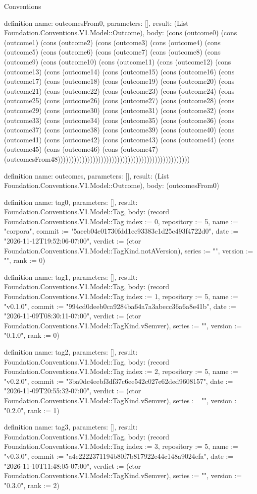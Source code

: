 \begin{lexlean}{Conventions}
\begin{semanticmodule}
definition{
  name: outcomesFrom0,
  parameters: [],
  result: (List Foundation.Conventions.V1.Model::Outcome),
  body: (cons (outcome0) (cons (outcome1) (cons (outcome2) (cons (outcome3) (cons (outcome4) (cons (outcome5) (cons (outcome6) (cons (outcome7) (cons (outcome8) (cons (outcome9) (cons (outcome10) (cons (outcome11) (cons (outcome12) (cons (outcome13) (cons (outcome14) (cons (outcome15) (cons (outcome16) (cons (outcome17) (cons (outcome18) (cons (outcome19) (cons (outcome20) (cons (outcome21) (cons (outcome22) (cons (outcome23) (cons (outcome24) (cons (outcome25) (cons (outcome26) (cons (outcome27) (cons (outcome28) (cons (outcome29) (cons (outcome30) (cons (outcome31) (cons (outcome32) (cons (outcome33) (cons (outcome34) (cons (outcome35) (cons (outcome36) (cons (outcome37) (cons (outcome38) (cons (outcome39) (cons (outcome40) (cons (outcome41) (cons (outcome42) (cons (outcome43) (cons (outcome44) (cons (outcome45) (cons (outcome46) (cons (outcome47) (outcomesFrom48)))))))))))))))))))))))))))))))))))))))))))))))))
}

definition{
  name: outcomes,
  parameters: [],
  result: (List Foundation.Conventions.V1.Model::Outcome),
  body: (outcomesFrom0)
}

definition{
  name: tag0,
  parameters: [],
  result: Foundation.Conventions.V1.Model::Tag,
  body: (record Foundation.Conventions.V1.Model::Tag {index := 0, repository := 5, name := "corpora", commit := "5aeeb04c01730fdd1ec93383c1d25c493f4722d0", date := "2026-11-12T19:52:06-07:00", verdict := (ctor Foundation.Conventions.V1.Model::TagKind.notAVersion), series := "", version := "", rank := 0})
}

definition{
  name: tag1,
  parameters: [],
  result: Foundation.Conventions.V1.Model::Tag,
  body: (record Foundation.Conventions.V1.Model::Tag {index := 1, repository := 5, name := "v0.1.0", commit := "994cd0deeb0ca9284ba64a7a3abecc36a6a8e41b", date := "2026-11-09T08:30:11-07:00", verdict := (ctor Foundation.Conventions.V1.Model::TagKind.vSemver), series := "", version := "0.1.0", rank := 0})
}

definition{
  name: tag2,
  parameters: [],
  result: Foundation.Conventions.V1.Model::Tag,
  body: (record Foundation.Conventions.V1.Model::Tag {index := 2, repository := 5, name := "v0.2.0", commit := "3ba0dc4eebf3df37c6ee542c027e62ded9608157", date := "2026-11-09T20:55:32-07:00", verdict := (ctor Foundation.Conventions.V1.Model::TagKind.vSemver), series := "", version := "0.2.0", rank := 1})
}

definition{
  name: tag3,
  parameters: [],
  result: Foundation.Conventions.V1.Model::Tag,
  body: (record Foundation.Conventions.V1.Model::Tag {index := 3, repository := 5, name := "v0.3.0", commit := "a4e2222371194b80f7b817922e44c148a9024efa", date := "2026-11-10T11:48:05-07:00", verdict := (ctor Foundation.Conventions.V1.Model::TagKind.vSemver), series := "", version := "0.3.0", rank := 2})
}


\end{semanticmodule}
\end{lexlean}
